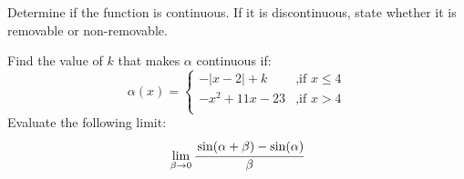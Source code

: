 \documentclass[addpoints,12pt]{exam}
\begin{document}
\begin{questions}

\question[3]
Determine if the function is continuous.  If it is discontinuous, state whether it is removable or non-removable.
	
\question[2]
Find the value of $k$ that makes $\alpha$ continuous if:
	\begin{equation*}
 			 \alpha(x) =\begin{cases}
      				-\vert x-2 \vert +k & \text{,if $x \leq 4$}\\
      				-x^2+11x-23 & \text{,if $x >4$}\\
    				\end{cases}       
		\end{equation*}
\vspace{2in} 
\question[5]
Evaluate the following limit:
$$\lim\limits_{\beta \to 0} \cfrac{\sin(\alpha+\beta)-\sin(\alpha)}{\beta}$$

\end{questions}
\end{document}

